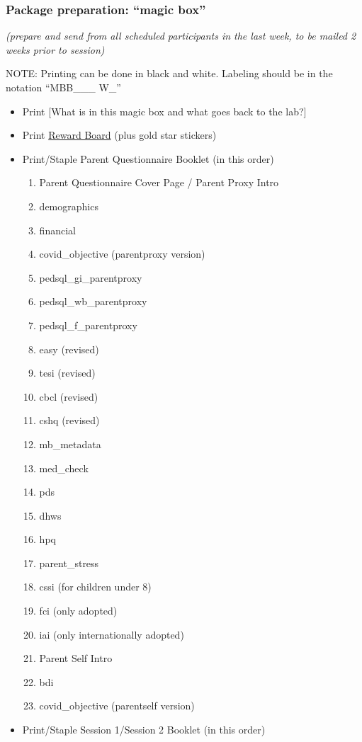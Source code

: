 \documentclass[
]{book}
\providecommand{\tightlist}{%
  \setlength{\itemsep}{0pt}\setlength{\parskip}{0pt}}
\begin{document}
\hypertarget{package-preparation-magic-box}{%
\subsubsection{Package preparation: ``magic box''}\label{package-preparation-magic-box}}

\emph{(prepare and send from all scheduled participants in the last week, to be mailed 2 weeks prior to session)}

NOTE: Printing can be done in black and white. Labeling should be in the notation ``MBB\_\_\_ W\_''

\begin{itemize}
\tightlist
\item
  Print {[}What is in this magic box and what goes back to the lab?{]}
\item
  Print \href{https://ucla.app.box.com/file/668504120930}{Reward Board} (plus gold star stickers)
\item
  Print/Staple Parent Questionnaire Booklet (in this order)

  \begin{enumerate}
  \def\labelenumi{\arabic{enumi}.}
  \tightlist
  \item
    Parent Questionnaire Cover Page / Parent Proxy Intro
  \item
    demographics
  \item
    financial
  \item
    covid\_objective (parentproxy version)
  \item
    pedsql\_gi\_parentproxy
  \item
    pedsql\_wb\_parentproxy
  \item
    pedsql\_f\_parentproxy
  \item
    easy (revised)
  \item
    tesi (revised)
  \item
    cbcl (revised)
  \item
    cshq (revised)
  \item
    mb\_metadata
  \item
    med\_check
  \item
    pds
  \item
    dhws
  \item
    hpq
  \item
    parent\_stress
  \item
    cssi (for children under 8)
  \item
    fci (only adopted)
  \item
    iai (only internationally adopted)
  \item
    Parent Self Intro
  \item
    bdi
  \item
    covid\_objective (parentself version)
  \end{enumerate}
\item
  Print/Staple Session 1/Session 2 Booklet (in this order)


\end{itemize}
\end{document}
